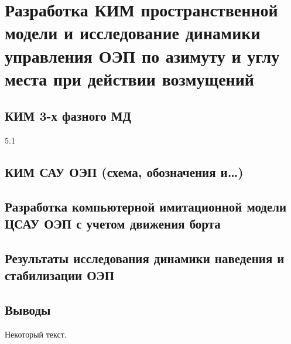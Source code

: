 \chapter{Разработка КИМ пространственной модели и исследование динамики управления ОЭП по азимуту и углу места при действии возмущений} \label{ch:ch5}

\section{КИМ 3-х фазного МД} \label{ch:ch5/sect1}

5.1  
\section{КИМ САУ ОЭП (схема, обозначения и…) } \label{ch:ch5/sect2}

\section{Разработка компьютерной имитационной модели ЦСАУ ОЭП с учетом  движения борта} \label{ch:ch5/sect3}

\section{Результаты исследования динамики наведения и стабилизации ОЭП} \label{ch:ch5/sect4}

\section{Выводы} \label{ch:ch5/sect5}
	


Некоторый текст.

\clearpage